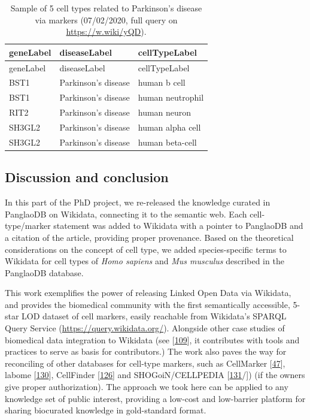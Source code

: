 \begin{longtable}[]{@{}lll@{}}
\caption{Sample of 5 cell types related to Parkinson's disease via markers (07/02/2020, full query on \url{https://w.wiki/yQD}).
\label{tbl:parkinson}}\tabularnewline
\toprule
geneLabel & diseaseLabel & cellTypeLabel \\
\midrule
\endfirsthead
\toprule
geneLabel & diseaseLabel & cellTypeLabel \\
\midrule
\endhead
BST1 & Parkinson's disease & human b cell \\
BST1 & Parkinson's disease & human neutrophil \\
RIT2 & Parkinson's disease & human neuron \\
SH3GL2 & Parkinson's disease & human alpha cell \\
SH3GL2 & Parkinson's disease & human beta-cell \\
\bottomrule
\end{longtable}

\hypertarget{discussion-and-conclusion}{%
\subsection{Discussion and conclusion}\label{discussion-and-conclusion}}

In this part of the PhD project, we re-released the knowledge curated in PanglaoDB on Wikidata, connecting it to the semantic web.
Each cell-type/marker statement was added to Wikidata with a pointer to PanglaoDB and a citation of the article, providing proper provenance.
Based on the theoretical considerations on the concept of cell type, we added species-specific terms to Wikidata for cell types of \emph{Homo sapiens} and \emph{Mus musculus} described in the PanglaoDB database.

This work exemplifies the power of releasing Linked Open Data via Wikidata, and provides the biomedical community with the first semantically accessible, 5-star LOD dataset of cell markers, easily reachable from Wikidata's SPARQL Query Service (\url{https://query.wikidata.org/}).
Alongside other case studies of biomedical data integration to Wikidata (see {[}\protect\hyperlink{ref-mPoPwN77}{109}{]}, it contributes with tools and practices to serve as basis for contributors.)
The work also paves the way for reconciling of other databases for cell-type markers, such as CellMarker {[}\protect\hyperlink{ref-chGii6yw}{47}{]}, labome {[}\protect\hyperlink{ref-rhRRCtlA}{130}{]}, CellFinder {[}\protect\hyperlink{ref-4AEy2xhQ}{126}{]} and SHOGoiN/CELLPEDIA {[}\protect\hyperlink{ref-6uWWsiSq}{131}/{]}) (if the owners give proper authorization).
The approach we took here can be applied to any knowledge set of public interest, providing a low-cost and low-barrier platform for sharing biocurated knowledge in gold-standard format.

